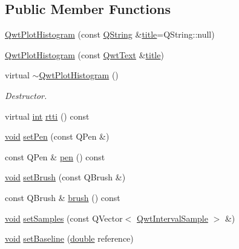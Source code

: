 \subsection*{Public Member Functions}
\begin{DoxyCompactItemize}
\item 
\hyperlink{class_qwt_plot_histogram_ada0642611a7edc4ea3beac45428fd786}{Qwt\-Plot\-Histogram} (const \hyperlink{group___u_a_v_objects_plugin_gab9d252f49c333c94a72f97ce3105a32d}{Q\-String} \&\hyperlink{class_qwt_plot_item_a3859d011b670b5f89e45d1ccef9206f7}{title}=Q\-String\-::null)
\item 
\hyperlink{class_qwt_plot_histogram_a5c0973a9425655be4218298706d25f38}{Qwt\-Plot\-Histogram} (const \hyperlink{class_qwt_text}{Qwt\-Text} \&\hyperlink{class_qwt_plot_item_a3859d011b670b5f89e45d1ccef9206f7}{title})
\item 
virtual \hyperlink{class_qwt_plot_histogram_a64bf6dad5655ef1ef3a0a1507d2feafb}{$\sim$\-Qwt\-Plot\-Histogram} ()
\begin{DoxyCompactList}\small\item\em Destructor. \end{DoxyCompactList}\item 
virtual \hyperlink{ioapi_8h_a787fa3cf048117ba7123753c1e74fcd6}{int} \hyperlink{class_qwt_plot_histogram_a7a927d6ad8544cf5d46e629a03a5a8f1}{rtti} () const 
\item 
\hyperlink{group___u_a_v_objects_plugin_ga444cf2ff3f0ecbe028adce838d373f5c}{void} \hyperlink{class_qwt_plot_histogram_a230e53561dd2645ba34beaa89f4f4f61}{set\-Pen} (const Q\-Pen \&)
\item 
const Q\-Pen \& \hyperlink{class_qwt_plot_histogram_a51727f20a46a48afbbc7f76a8ea6ec84}{pen} () const 
\item 
\hyperlink{group___u_a_v_objects_plugin_ga444cf2ff3f0ecbe028adce838d373f5c}{void} \hyperlink{class_qwt_plot_histogram_a0bf40c3f9f9074cac5deecd4525583b3}{set\-Brush} (const Q\-Brush \&)
\item 
const Q\-Brush \& \hyperlink{class_qwt_plot_histogram_ae72360d1812a8137a0c7ee6b6a5ebebd}{brush} () const 
\item 
\hyperlink{group___u_a_v_objects_plugin_ga444cf2ff3f0ecbe028adce838d373f5c}{void} \hyperlink{class_qwt_plot_histogram_a6cc1fe6cd9f7dfc55a2bf5afd02ccce5}{set\-Samples} (const Q\-Vector$<$ \hyperlink{class_qwt_interval_sample}{Qwt\-Interval\-Sample} $>$ \&)
\item 
\hyperlink{group___u_a_v_objects_plugin_ga444cf2ff3f0ecbe028adce838d373f5c}{void} \hyperlink{class_qwt_plot_histogram_a372314f4e2921673f74d46773d583cf2}{set\-Baseline} (\hyperlink{_super_l_u_support_8h_a8956b2b9f49bf918deed98379d159ca7}{double} reference)

\end{DoxyCompactItemize}
